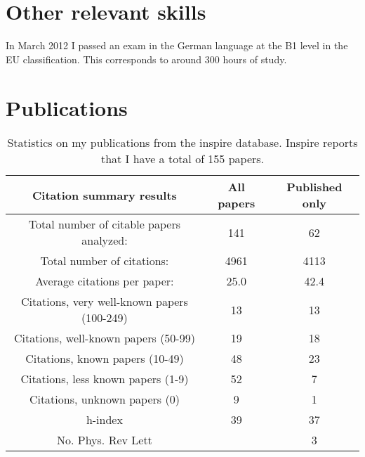 \documentclass[12pt]{article}
\begin{document}
\section{Other relevant skills}

In March 2012 I passed an exam in the German language
at the B1 level in the EU classification. 
This corresponds to around 300 hours of study.




\section{Publications}


\begin{table}[tb]
\centering
\begin{tabular}{|c|c|c|} \hline
Citation summary results	& All papers	& Published only
\\ \hline
Total number of citable papers analyzed: &	141 &	  62 \\
Total number of citations:  &   4961	 &	4113 \\
Average citations per paper:   & 25.0	&	42.4 \\
Citations, very well-known papers (100-249) &	13 &	13 \\
Citations, well-known papers (50-99)	&	19 &	18 \\
Citations, known papers (10-49)		&	48 &	23 \\
Citations, less known papers (1-9)	&	52 &	7 \\
Citations, unknown papers (0)		&	9  &	1  \\
h-index                                 &     39	&    37 \\
No. Phys. Rev Lett &	    	&    3 \\
\hline
\end{tabular}
\label{tb:fb1summary}
  \caption{
Statistics on my publications from the inspire database. Inspire
reports that I have a total of 155 papers.
}
\end{table}







\end{document}
